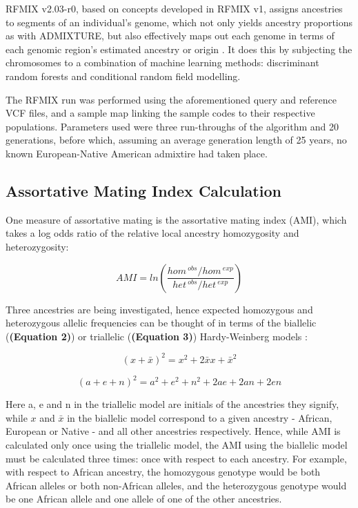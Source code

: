 \documentclass[11pt]{article}
\begin{document}
RFMIX v2.03-r0, based on concepts developed in RFMIX v1, assigns ancestries to segments of an individual's genome, which not only yields ancestry proportions as with ADMIXTURE, but also effectively maps out each genome in terms of each genomic region's estimated ancestry or origin \parencite{Maples2013}. It does this by subjecting the chromosomes to a combination of machine learning methods: discriminant random forests and conditional random field modelling.

The RFMIX run was performed using the aforementioned query and reference VCF files, and a sample map linking the sample codes to their respective populations. Parameters used were three run-throughs of the algorithm and 20 generations, before which, assuming an average generation length of 25 years, no known European-Native American admixtire had taken place.





\subsection{Assortative Mating Index Calculation}


One measure of assortative mating is the assortative mating index (AMI), which takes a log odds ratio of the relative local ancestry homozygosity and heterozygosity:


\begin{equation}
    AMI = ln{\left( \frac{ hom^{\: obs} / hom^{\: exp} }
                         { het^{\: obs} / het^{\: exp} } \right)}
\end{equation}
\vspace{3mm}


Three ancestries are being investigated, hence expected homozygous and heterozygous allelic frequencies can be thought of in terms of the biallelic (\textbf{(Equation 2)}) or triallelic (\textbf{(Equation 3)}) Hardy-Weinberg models \parencite{Norris2019}: 

\begin{equation}
    (x + \bar{x})^{2} = x^{2} + 2\bar{x}x + \bar{x}^{2}
\end{equation}


\begin{equation}
    (a + e + n)^{2} = a^{2} + e^{2} + n^{2} + 2ae + 2an + 2en
\end{equation}
\vspace{3mm}


Here a, e and n in the triallelic model are initials of the ancestries they signify, while $x$ and $\bar{x}$ in the biallelic model correspond to a given ancestry - African, European or Native - and all other ancestries respectively. Hence, while AMI is calculated only once using the triallelic model, the AMI using the biallelic model must be calculated three times: once with respect to each ancestry. For example, with respect to African ancestry, the homozygous genotype would be both African alleles or both non-African alleles, and the heterozygous genotype would be one African allele and one allele of one of the other ancestries.
\end{document}
